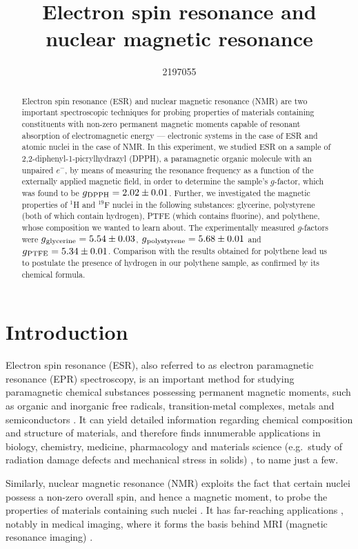 \documentclass[a4paper]{jpconf}
\numberwithin{equation}{section}
\begin{document}
\title{Electron spin resonance and nuclear magnetic resonance}
\author{2197055}

\begin{abstract}
Electron spin resonance (ESR) and nuclear magnetic resonance (NMR) are two important spectroscopic techniques for probing properties of materials containing constituents with non-zero permanent magnetic moments capable of resonant absorption of electromagnetic energy --- electronic systems in the case of ESR and atomic nuclei in the case of NMR. In this experiment, we studied ESR on a sample of 2,2-diphenyl-1-picrylhydrazyl (DPPH), a paramagnetic organic molecule with an unpaired $e^-$, by means of measuring the resonance frequency as a function of the externally applied magnetic field, in order to determine the sample\textquoteright s $g$-factor, which was found to be $g\textsubscript{DPPH} = 2.02 \pm 0.01$.
Further, we investigated the magnetic properties of ${}^1$H and ${}^{19}$F nuclei in the following substances: glycerine, polystyrene (both of which contain hydrogen), PTFE (which contains fluorine), and polythene, whose composition we wanted to learn about. The experimentally measured $g$-factors were $g\textsubscript{glycerine} = 5.54 \pm 0.03$, $g\textsubscript{polystyrene} = 5.68 \pm 0.01$ and $g\textsubscript{PTFE} = 5.34 \pm 0.01$. Comparison with the results obtained for polythene lead us to postulate the presence of hydrogen in our polythene sample, as confirmed by its chemical formula.
\end{abstract}

\section{Introduction}
Electron spin resonance (ESR), also referred to as electron paramagnetic resonance (EPR) spectroscopy,      
is an important method for studying paramagnetic chemical substances possessing permanent magnetic moments, such as organic and inorganic free radicals, transition-metal complexes, metals and semiconductors \cite{Lancaster}. It can yield detailed information regarding chemical composition and structure of materials, and therefore finds innumerable applications in biology, chemistry, medicine, pharmacology and materials science (e.g.\ study of radiation damage defects and mechanical stress in solids) \cite{Lancaster}, to name just a few.

Similarly, nuclear magnetic resonance (NMR) exploits the fact that certain nuclei possess a non-zero overall spin, and hence a magnetic moment, to probe the properties of materials containing such nuclei \cite{Smith}. It has far-reaching applications \cite{Gero}, notably in medical imaging, where it forms the basis behind MRI (magnetic resonance imaging) \cite{Haidekker}.
\end{document}
